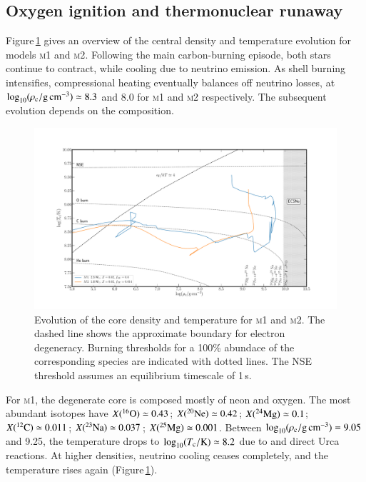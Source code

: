 \documentclass{aa}
\begin{document}
\subsection{Oxygen ignition and thermonuclear runaway}\label{sec:runway}
Figure\,\ref{fig:2} gives an overview of the central density and temperature evolution for models  \textsc{m1} and \textsc{m2}.
Following the main carbon-burning episode, both stars continue to contract, while cooling  due to neutrino  emission. As shell 
burning intensifies, compressional heating eventually balances 
off neutrino losses, at $\logrhoc \simeq 8.3$ and 8.0 for \textsc{m1} and \textsc{m2} respectively. The subsequent evolution depends on the composition. 
\begin{figure}[htb!]
\begin{center}
\includegraphics[width=1.0\textwidth]{Rhoc_vs_Tc.pdf}
\caption{Evolution of the core density and temperature for \textsc{m1} and \textsc{m2}. The dashed line shows the approximate boundary for electron degeneracy. Burning thresholds for a 100\% abundace of the corresponding species are indicated with dotted lines. The NSE threshold assumes an equilibrium timescale of 1\,s.}
\label{fig:2}
\end{center}
\end{figure}
For \textsc{m1}, the degenerate core is composed 
mostly of neon and oxygen. The most abundant isotopes have  $\abun{O}{16}\simeq 0.43$;  $\abun{Ne}{20}\simeq 0.42$; $\abun{Mg}{24}\simeq0.1$;  $\abun{C}{12}\simeq 0.011$; $\abun{Na}{23}\simeq 0.037$; $\abun{Mg}{25}\simeq 0.001$. Between $\logrhoc=9.05$ and 9.25, the temperature drops to $\logtc\simeq 8.2$ due to  and  direct Urca reactions. At higher densities, neutrino cooling ceases completely, and the temperature rises again (Figure\,\ref{fig:2}). 
\end{document}
